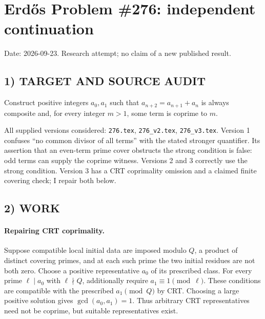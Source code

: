 \section{Erd\H{o}s Problem \#276: independent continuation}
\noindent Date: 2026-09-23. Research attempt; no claim of a new published result.
\subsection{1) TARGET AND SOURCE AUDIT}
Construct positive integers $a_0,a_1$ such that $a_{n+2}=a_{n+1}+a_n$ is always composite and, for every integer $m>1$, some term is coprime to $m$.

All supplied versions considered: \texttt{276.tex}, \texttt{276\_v2.tex}, \texttt{276\_v3.tex}.
Version 1 confuses ``no common divisor of all terms'' with the stated stronger quantifier. Its assertion that an even-term prime cover obstructs the strong condition is false: odd terms can supply the coprime witness. Versions 2 and 3 correctly use the strong condition. Version 3 has a CRT coprimality omission and a claimed finite covering check; I repair both below.
\subsection{2) WORK}
\paragraph{Repairing CRT coprimality.}
Suppose compatible local initial data are imposed modulo $Q$, a product of distinct covering primes, and at each such prime the two initial residues are not both zero. Choose a positive representative $a_0$ of its prescribed class. For every prime $\ell\mid a_0$ with $\ell\nmid Q$, additionally require $a_1\equiv1\pmod\ell$. These conditions are compatible with the prescribed $a_1\pmod Q$ by CRT. Choosing a large positive solution gives $\gcd(a_0,a_1)=1$. Thus arbitrary CRT representatives need not be coprime, but suitable representatives exist.

